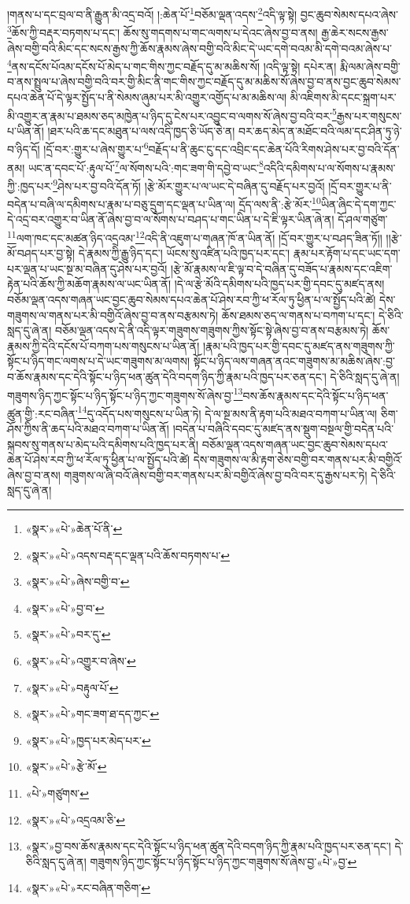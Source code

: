 །གནས་པ་དང་བྲལ་བ་ནི་རྒྱུན་མི་འདྲ་བའོ། །:ཆེན་པོ་\footnote{«སྣར་»«པེ་»ཆེན་པོ་ནི་}བཅོམ་ལྡན་འདས་\footnote{«སྣར་»«པེ་»འདས་བརྡ་དང་ལྡན་པའི་ཆོས་བཏགས་པ་}འདི་ལྟ་སྟེ། བྱང་ཆུབ་སེམས་དཔའ་ཞེས་\footnote{«སྣར་»«པེ་»ཞེས་བགྱི་བ་}ཆོས་ཀྱི་བརྡར་བཏགས་པ་དང་། ཆོས་སུ་གདགས་པ་གང་ལགས་པ་དེའང་ཞེས་བྱ་བ་ནས། རྒྱ་ཆེར་སངས་རྒྱས་ཞེས་བགྱི་བའི་མིང་དང་སངས་རྒྱས་ཀྱི་ཆོས་རྣམས་ཞེས་བགྱི་བའི་མིང་དེ་ཡང་དགེ་བའམ་མི་དགེ་བའམ་ཞེས་པ་\footnote{«སྣར་»«པེ་»བྱ་བ་}ནས་དངོས་པོའམ་དངོས་པོ་མེད་པ་གང་གིས་ཀྱང་བརྗོད་དུ་མ་མཆིས་སོ། །འདི་ལྟ་སྟེ། དཔེར་ན། རྨི་ལམ་ཞེས་བགྱི་བ་ནས་སྤྲུལ་པ་ཞེས་བགྱི་བའི་བར་གྱི་མིང་ནི་གང་གིས་ཀྱང་བརྗོད་དུ་མ་མཆིས་སོ་ཞེས་བྱ་བ་ནས་བྱང་ཆུབ་སེམས་དཔའ་ཆེན་པོ་དེ་ལྟར་སྤྱོད་པ་ནི་སེམས་ཞུམ་པར་མི་འགྱུར་འགྱོད་པ་མ་མཆིས་ལ། མི་འཇིགས་མི་དངང་སྐྲག་པར་མི་འགྱུར་ན་རྣམ་པ་ཐམས་ཅད་མཁྱེན་པ་ཉིད་དུ་ངེས་པར་འབྱུང་བ་ལགས་སོ་ཞེས་བྱ་བའི་བར་\footnote{«སྣར་»«པེ་»བར་དུ་}རྒྱས་པར་གསུངས་པ་ཡིན་ནོ། །ཐར་པའི་ཆ་དང་མཐུན་པ་ལས་འདི་ཁྱད་ཅི་ཡོད་ཅེ་ན། བར་ཆད་མེད་ན་མཐོང་བའི་ལམ་དང་ཤིན་ཏུ་ཉེ་བ་ཉིད་དོ། །དྲོ་བར་:གྱུར་པ་ཞེས་གྱུར་པ་\footnote{«སྣར་»«པེ་»འགྱུར་བ་ཞེས་}བརྗོད་པ་ནི་ཆུང་ངུ་དང་འབྲིང་དང་ཆེན་པོའི་རིགས་ཤེས་པར་བྱ་བའི་དོན་ནམ། ཡང་ན་དབང་པོ་:རྟུལ་པོ་\footnote{«སྣར་»«པེ་»བརྟུལ་པོ་}ལ་སོགས་པའི་:གང་ཟག་གི་དབྱེ་བ་ཡང་\footnote{«སྣར་»«པེ་»གང་ཟག་ཐ་དད་ཀྱང་}འདིའི་དམིགས་པ་ལ་སོགས་པ་རྣམས་ཀྱི་:ཁྱད་པར་\footnote{«སྣར་»«པེ་»ཁྱད་པར་མེད་པར་}ཤེས་པར་བྱ་བའི་དོན་ཏོ། །རྩེ་མོར་གྱུར་པ་ལ་ཡང་དེ་བཞིན་དུ་བརྗོད་པར་བྱའོ། །དྲོ་བར་གྱུར་པ་ནི་བདེན་པ་བཞི་ལ་དམིགས་པ་རྣམ་པ་བཅུ་དྲུག་དང་ལྡན་པ་ཡིན་ལ། དྲོད་ལས་ནི་:རྩེ་མོར་\footnote{«སྣར་»«པེ་»རྩེ་མོ་}ཡིན་ཞིང་དེ་དག་ཀྱང་དེ་འདྲ་བར་འགྱུར་བ་ཡིན་ནོ་ཞེས་བྱ་བ་ལ་སོགས་པ་བཤད་པ་གང་ཡིན་པ་དེ་ཇི་ལྟར་ཡིན་ཞེ་ན། དོ་ཤལ་གཙུག་\footnote{«པེ་»གཙུགས་}ལག་ཁང་དང་མཚན་ཉིད་འདྲའམ་\footnote{«སྣར་»«པེ་»འདྲའམ་ཅི་}འདི་ནི་འཇུག་པ་གཞན་ཁོ་ན་ཡིན་ནོ། །དྲོ་བར་གྱུར་པ་བཤད་ཟིན་ཏོ།། །།རྩེ་མོ་བཤད་པར་བྱ་སྟེ། དེ་རྣམས་ཀྱི་རྒྱུ་ཉིད་དང་། ཡོངས་སུ་འཛིན་པའི་ཁྱད་པར་དང་། རྣམ་པར་རྟོག་པ་དང་ཡང་དག་པར་ལྡན་པ་ཡང་སྔ་མ་བཞིན་དུ་ཤེས་པར་བྱའོ། །རྩེ་མོ་རྣམས་ལ་ཇི་ལྟ་བ་དེ་བཞིན་དུ་བཟོད་པ་རྣམས་དང་འཇིག་རྟེན་པའི་ཆོས་ཀྱི་མཆོག་རྣམས་ལ་ཡང་ཡིན་ནོ། །དེ་ལ་རྩེ་མོའི་དམིགས་པའི་ཁྱད་པར་གྱི་དབང་དུ་མཛད་ནས། བཅོམ་ལྡན་འདས་གཞན་ཡང་བྱང་ཆུབ་སེམས་དཔའ་ཆེན་པོ་ཤེས་རབ་ཀྱི་ཕ་རོལ་ཏུ་ཕྱིན་པ་ལ་སྤྱོད་པའི་ཚེ། དེས་གཟུགས་ལ་གནས་པར་མི་བགྱིའོ་ཞེས་བྱ་བ་ནས་བརྩམས་ཏེ། ཆོས་ཐམས་ཅད་ལ་གནས་པ་བཀག་པ་དང་། དེ་ཅིའི་སླད་དུ་ཞེ་ན། བཅོམ་ལྡན་འདས་དེ་ནི་འདི་ལྟར་གཟུགས་གཟུགས་ཀྱིས་སྟོང་སྟེ་ཞེས་བྱ་བ་ནས་བརྩམས་ཏེ། ཆོས་རྣམས་ཀྱི་དེའི་དངོས་པོ་བཀག་པས་གསུངས་པ་ཡིན་ནོ། །རྣམ་པའི་ཁྱད་པར་གྱི་དབང་དུ་མཛད་ནས་གཟུགས་ཀྱི་སྟོང་པ་ཉིད་གང་ལགས་པ་དེ་ཡང་གཟུགས་མ་ལགས། སྟོང་པ་ཉིད་ལས་གཞན་ནའང་གཟུགས་མ་མཆིས་ཞེས་:བྱ་བ་ཆོས་རྣམས་དང་དེའི་སྟོང་པ་ཉིད་ཕན་ཚུན་དེའི་བདག་ཉིད་ཀྱི་རྣམ་པའི་ཁྱད་པར་ཅན་དང་། དེ་ཅིའི་སླད་དུ་ཞེ་ན། གཟུགས་ཉིད་ཀྱང་སྟོང་པ་ཉིད་སྟོང་པ་ཉིད་ཀྱང་གཟུགས་སོ་ཞེས་བྱ་\footnote{«སྣར་»བྱ་བས་ཆོས་རྣམས་དང་དེའི་སྟོང་པ་ཉིད་ཕན་ཚུན་དེའི་བདག་ཉིད་ཀྱི་རྣམ་པའི་ཁྱད་པར་ཅན་དང་། དེ་ཅིའི་སླད་དུ་ཞེ་ན། གཟུགས་ཉིད་ཀྱང་སྟོང་པ་ཉིད་སྟོང་པ་ཉིད་ཀྱང་གཟུགས་སོ་ཞེས་བྱ་«པེ་»བྱ་}བས་ཆོས་རྣམས་དང་དེའི་སྟོང་པ་ཉིད་ཕན་ཚུན་གྱི་:རང་བཞིན་\footnote{«སྣར་»«པེ་»རང་བཞིན་གཅིག་}དུ་འདོད་པས་གསུངས་པ་ཡིན་ཏེ། དེ་ལ་སྔ་མས་ནི་རྟག་པའི་མཐའ་བཀག་པ་ཡིན་ལ། ཅིག་ཤོས་ཀྱིས་ནི་ཆད་པའི་མཐའ་བཀག་པ་ཡིན་ནོ། །བདེན་པ་བཞིའི་དབང་དུ་མཛད་ནས་སྡུག་བསྔལ་གྱི་བདེན་པའི་སྐབས་སུ་གནས་པ་མེད་པའི་དམིགས་པའི་ཁྱད་པར་ནི། བཅོམ་ལྡན་འདས་གཞན་ཡང་བྱང་ཆུབ་སེམས་དཔའ་ཆེན་པོ་ཤེས་རབ་ཀྱི་ཕ་རོལ་ཏུ་ཕྱིན་པ་ལ་སྤྱོད་པའི་ཚེ། དེས་གཟུགས་ལ་མི་རྟག་ཅེས་བགྱི་བར་གནས་པར་མི་བགྱིའོ་ཞེས་བྱ་བ་ནས། གཟུགས་ལ་ཞི་བའོ་ཞེས་བགྱི་བར་གནས་པར་མི་བགྱིའོ་ཞེས་བྱ་བའི་བར་དུ་རྒྱས་པར་ཏེ། དེ་ཅིའི་སླད་དུ་ཞེ་ན། 